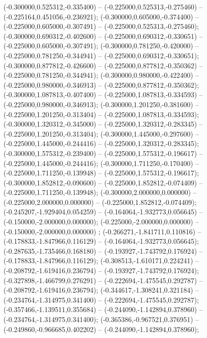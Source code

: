  (-0.300000,0.525312,-0.335400) -- (-0.225000,0.525313,-0.275460) -- (-0.225164,0.451056,-0.236921);
 (-0.300000,0.605000,-0.374400) -- (-0.225000,0.605000,-0.307491) -- (-0.225000,0.525313,-0.275460);
 (-0.300000,0.690312,-0.402600) -- (-0.225000,0.690312,-0.330651) -- (-0.225000,0.605000,-0.307491);
 (-0.300000,0.781250,-0.420000) -- (-0.225000,0.781250,-0.344941) -- (-0.225000,0.690312,-0.330651);
 (-0.300000,0.877812,-0.426600) -- (-0.225000,0.877812,-0.350362) -- (-0.225000,0.781250,-0.344941);
 (-0.300000,0.980000,-0.422400) -- (-0.225000,0.980000,-0.346913) -- (-0.225000,0.877812,-0.350362);
 (-0.300000,1.087813,-0.407400) -- (-0.225000,1.087813,-0.334593) -- (-0.225000,0.980000,-0.346913);
 (-0.300000,1.201250,-0.381600) -- (-0.225000,1.201250,-0.313404) -- (-0.225000,1.087813,-0.334593);
 (-0.300000,1.320312,-0.345000) -- (-0.225000,1.320312,-0.283345) -- (-0.225000,1.201250,-0.313404);
 (-0.300000,1.445000,-0.297600) -- (-0.225000,1.445000,-0.244416) -- (-0.225000,1.320312,-0.283345);
 (-0.300000,1.575312,-0.239400) -- (-0.225000,1.575312,-0.196617) -- (-0.225000,1.445000,-0.244416);
 (-0.300000,1.711250,-0.170400) -- (-0.225000,1.711250,-0.139948) -- (-0.225000,1.575312,-0.196617);
 (-0.300000,1.852812,-0.090600) -- (-0.225000,1.852812,-0.074409) -- (-0.225000,1.711250,-0.139948);
 (-0.300000,2.000000,0.000000) -- (-0.225000,2.000000,0.000000) -- (-0.225000,1.852812,-0.074409);
 (-0.245207,-1.929404,0.054259) -- (-0.164064,-1.932773,0.056645) -- (-0.150000,-2.000000,0.000000);
 (-0.225000,-2.000000,0.000000) -- (-0.150000,-2.000000,0.000000) ;
 (-0.266271,-1.841711,0.110816) -- (-0.178833,-1.847966,0.116129) -- (-0.164064,-1.932773,0.056645);
 (-0.287635,-1.735466,0.168180) -- (-0.193927,-1.743792,0.176924) -- (-0.178833,-1.847966,0.116129);
 (-0.308513,-1.610171,0.224241) -- (-0.208792,-1.619416,0.236794) -- (-0.193927,-1.743792,0.176924);
 (-0.327898,-1.466799,0.276291) -- (-0.222694,-1.475545,0.292787) -- (-0.208792,-1.619416,0.236794);
 (-0.344617,-1.308241,0.321184) -- (-0.234764,-1.314975,0.341400) -- (-0.222694,-1.475545,0.292787);
 (-0.357466,-1.139511,0.355684) -- (-0.244090,-1.142894,0.378960) -- (-0.234764,-1.314975,0.341400);
 (-0.365386,-0.967521,0.376951) -- (-0.249860,-0.966685,0.402202) -- (-0.244090,-1.142894,0.378960);
